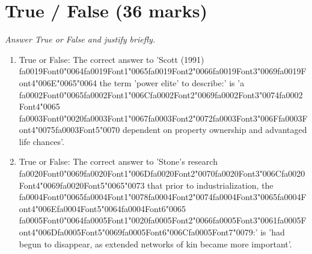 \documentclass[12pt]{article}
\begin{document}
\section*{True / False (36 marks)}
\textit{Answer True or False and justify briefly.}
\begin{enumerate}[label=\arabic*.]
\item True or False: The correct answer to 'Scott (1991) {\csname fa0019Font0\endcsname\char"0064}{\csname fa0019Font1\endcsname\char"0065}{\csname fa0019Font2\endcsname\char"0066}{\csname fa0019Font3\endcsname\char"0069}{\csname fa0019Font4\endcsname\char"006E}{\char"0065}{\char"0064} the term 'power elite' to describe:' is 'a {\csname fa0002Font0\endcsname\char"0065}{\csname fa0002Font1\endcsname\char"006C}{\csname fa0002Font2\endcsname\char"0069}{\csname fa0002Font3\endcsname\char"0074}{\csname fa0002Font4\endcsname\char"0065} {\csname fa0003Font0\endcsname\char"0020}{\csname fa0003Font1\endcsname\char"0067}{\csname fa0003Font2\endcsname\char"0072}{\csname fa0003Font3\endcsname\char"006F}{\csname fa0003Font4\endcsname\char"0075}{\csname fa0003Font5\endcsname\char"0070} dependent on property ownership and advantaged life chances'.
\item True or False: The correct answer to 'Stone's research {\csname fa0020Font0\endcsname\char"0069}{\csname fa0020Font1\endcsname\char"006D}{\csname fa0020Font2\endcsname\char"0070}{\csname fa0020Font3\endcsname\char"006C}{\csname fa0020Font4\endcsname\char"0069}{\csname fa0020Font5\endcsname\char"0065}{\char"0073} that prior to industrialization, the {\csname fa0004Font0\endcsname\char"0065}{\csname fa0004Font1\endcsname\char"0078}{\csname fa0004Font2\endcsname\char"0074}{\csname fa0004Font3\endcsname\char"0065}{\csname fa0004Font4\endcsname\char"006E}{\csname fa0004Font5\endcsname\char"0064}{\csname fa0004Font6\endcsname\char"0065} {\csname fa0005Font0\endcsname\char"0064}{\csname fa0005Font1\endcsname\char"0020}{\csname fa0005Font2\endcsname\char"0066}{\csname fa0005Font3\endcsname\char"0061}{\csname fa0005Font4\endcsname\char"006D}{\csname fa0005Font5\endcsname\char"0069}{\csname fa0005Font6\endcsname\char"006C}{\csname fa0005Font7\endcsname\char"0079}:' is 'had begun to disappear, as extended networks of kin became more important'.

\end{enumerate}
\end{document}
